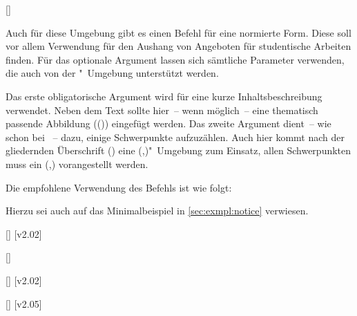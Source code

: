 \begin{DeclareEntity}{}
\begin{Declaration}
  {[\OList{}]}
\printdeclarationlist

Auch für diese Umgebung gibt es einen Befehl für eine normierte Form. Diese 
soll vor allem Verwendung für den Aushang von Angeboten für studentische 
Arbeiten finden. Für das optionale Argument lassen sich sämtliche Parameter 
verwenden, die auch von der "~Umgebung unterstützt werden.

Das erste obligatorische Argument wird für eine kurze Inhaltsbeschreibung 
verwendet. Neben dem Text sollte hier~--  wenn möglich~--  eine thematisch 
passende Abbildung (()) eingefügt 
werden. Das zweite Argument dient~-- wie schon bei ~-- dazu, 
einige Schwerpunkte aufzuzählen. Auch hier kommt nach der gliedernden 
Überschrift () eine 
(,)"~Umgebung zum 
Einsatz, allen Schwerpunkten muss ein 
(,) vorangestellt werden.
\end{Declaration}
%
\begin{Example}
Die empfohlene Verwendung des Befehls  ist wie folgt:
\begin{Code}
\end{Code}
Hierzu sei auch auf das Minimalbeispiel in \autoref{sec:exmpl:notice} 
verwiesen.%
%
\end{Example}

\begin{Declaration}
  {[]}
  [v2.02]
\begin{Declaration}
  {[]}
\begin{Declaration}
  {[]}
  [v2.02]
\begin{Declaration}
  {[]}
  [v2.05]
\printdeclarationlist


\end{Declaration}
\end{Declaration}
\end{Declaration}
\end{Declaration}
\end{DeclareEntity}
